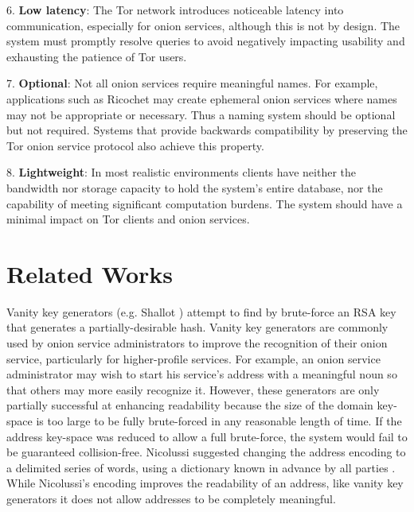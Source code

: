 \documentclass[USenglish,oneside,twocolumn]{article}
\begin{document}
6. \textbf{Low latency}: The Tor network introduces noticeable latency into communication, especially for onion services, although this is not by design. The system must promptly resolve queries to avoid negatively impacting usability and exhausting the patience of Tor users.

7. \textbf{Optional}: Not all onion services require meaningful names. For example, applications such as Ricochet \cite{RicochetGithub} may create ephemeral onion services where names may not be appropriate or necessary. Thus a naming system should be optional but not required. Systems that provide backwards compatibility by preserving the Tor onion service protocol also achieve this property.

8. \textbf{Lightweight}: In most realistic environments clients have neither the bandwidth nor storage capacity to hold the system's entire database, nor the capability of meeting significant computation burdens. The system should have a minimal impact on Tor clients and onion services.

\vspace{-10pt}
\section{Related Works}
\label{sec:RelatedWorks}

Vanity key generators (e.g. Shallot \cite{KatmagicShallot}) attempt to find by brute-force an RSA key that generates a partially-desirable hash. Vanity key generators are commonly used by onion service administrators to improve the recognition of their onion service, particularly for higher-profile services. For example, an onion service administrator may wish to start his service's address with a meaningful noun so that others may more easily recognize it. However, these generators are only partially successful at enhancing readability because the size of the domain key-space is too large to be fully brute-forced in any reasonable length of time. If the address key-space was reduced to allow a full brute-force, the system would fail to be guaranteed collision-free. Nicolussi suggested changing the address encoding to a delimited series of words, using a dictionary known in advance by all parties \cite{nicolussi2011human}. While Nicolussi's encoding improves the readability of an address, like vanity key generators it does not allow addresses to be completely meaningful.
\end{document}
